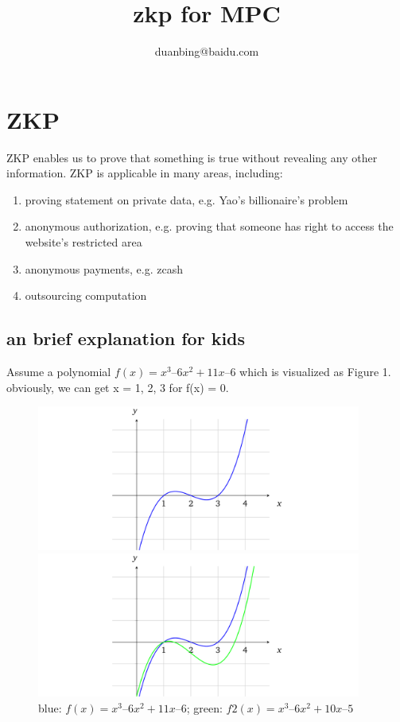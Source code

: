\documentclass[a4paper,11pt]{article}
\author{duanbing@baidu.com}
\title{zkp for MPC}
\begin{document}
\maketitle  
\tableofcontents


\section{ZKP}

ZKP enables us to prove that something is true without revealing any other information.  ZKP is applicable in many areas, including:
\begin{enumerate}
\item proving statement on private data, e.g. Yao's billionaire's problem
\item anonymous authorization, e.g. proving that someone has right to  access the website's restricted area
\item anonymous payments,   e.g. zcash
\item outsourcing computation  
\end{enumerate}

\subsection {an brief explanation for kids}

Assume a polynomial $f(x) = x^3 – 6x^2 + 11x – 6$ which is visualized as Figure 1.  obviously, we can get x = 1, 2, 3 for f(x) = 0.   

\begin{figure}[H]
\begin{minipage}[t]{0.5\linewidth}
\centering
\includegraphics[width=4.2in]{./images/zkp/f1.png}
\caption{$f(x) = x^3 – 6x^2 + 11x – 6$}
\label{fig:side:a}
\end{minipage}
\begin{minipage}[t]{0.5\linewidth}
\centering
\includegraphics[width=4.2in]{./images/zkp/f2.png}
\caption{blue: $f(x) = x^3 – 6x^2 + 11x – 6$; green: $f2(x) = x^3 – 6x^2 + 10x – 5$}
\label{fig:side:b}
\end{minipage}
\end{figure}
\end{document}
